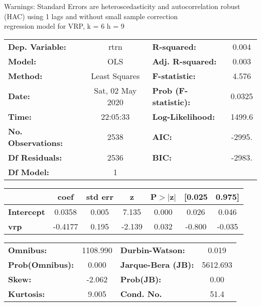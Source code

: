 Warnings: \newline
 [1] Standard Errors are heteroscedasticity and autocorrelation robust (HAC) using 1 lags and without small sample correction\\ 

regression model for VRP, k = 6 h = 9\begin{center}
\begin{tabular}{lclc}
\toprule
\textbf{Dep. Variable:}    &       rtrn       & \textbf{  R-squared:         } &     0.004   \\
\textbf{Model:}            &       OLS        & \textbf{  Adj. R-squared:    } &     0.003   \\
\textbf{Method:}           &  Least Squares   & \textbf{  F-statistic:       } &     4.576   \\
\textbf{Date:}             & Sat, 02 May 2020 & \textbf{  Prob (F-statistic):} &   0.0325    \\
\textbf{Time:}             &     22:05:33     & \textbf{  Log-Likelihood:    } &    1499.6   \\
\textbf{No. Observations:} &        2538      & \textbf{  AIC:               } &    -2995.   \\
\textbf{Df Residuals:}     &        2536      & \textbf{  BIC:               } &    -2983.   \\
\textbf{Df Model:}         &           1      & \textbf{                     } &             \\
\bottomrule
\end{tabular}
\begin{tabular}{lcccccc}
                   & \textbf{coef} & \textbf{std err} & \textbf{z} & \textbf{P$> |$z$|$} & \textbf{[0.025} & \textbf{0.975]}  \\
\midrule
\textbf{Intercept} &       0.0358  &        0.005     &     7.135  &         0.000        &        0.026    &        0.046     \\
\textbf{vrp}       &      -0.4177  &        0.195     &    -2.139  &         0.032        &       -0.800    &       -0.035     \\
\bottomrule
\end{tabular}
\begin{tabular}{lclc}
\textbf{Omnibus:}       & 1108.990 & \textbf{  Durbin-Watson:     } &    0.019  \\
\textbf{Prob(Omnibus):} &   0.000  & \textbf{  Jarque-Bera (JB):  } & 5612.693  \\
\textbf{Skew:}          &  -2.062  & \textbf{  Prob(JB):          } &     0.00  \\
\textbf{Kurtosis:}      &   9.005  & \textbf{  Cond. No.          } &     51.4  \\
\bottomrule
\end{tabular}
\end{center}

